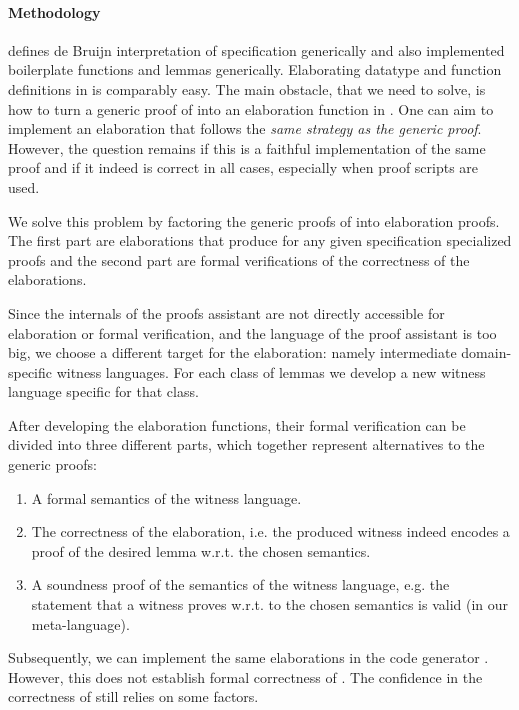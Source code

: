 \paragraph{Methodology}
\Loom defines de Bruijn interpretation of \Knot specification generically and
also implemented boilerplate functions and lemmas generically. Elaborating
datatype and function definitions in \Needle is comparably easy. The main
obstacle, that we need to solve, is how to turn a generic proof of \Loom into an
elaboration function in \Needle. One can aim to implement an elaboration that
follows the \emph{same strategy as the generic proof}. However, the question
remains if this is a faithful implementation of the same proof and if it indeed
is correct in all cases, especially when proof scripts are used.

We solve this problem by factoring the generic proofs of \Loom into elaboration
proofs. The first part are elaborations that produce for any given specification
specialized proofs and the second part are formal verifications of the
correctness of the elaborations.

Since the internals of the proofs assistant are not directly accessible for
elaboration or formal verification, and the language of the proof assistant is
too big, we choose a different target for the elaboration: namely intermediate
domain-specific witness languages. For each class of lemmas we develop a new
witness language specific for that class.

After developing the elaboration functions, their formal verification can be
divided into three different parts, which together represent alternatives to the
generic proofs:
\begin{enumerate}
\item A formal semantics of the witness language.
\item The correctness of the elaboration, i.e. the produced witness indeed
  encodes a proof of the desired lemma w.r.t. the chosen semantics.
\item A soundness proof of the semantics of the witness language, e.g. the
  statement that a witness proves w.r.t. to the chosen semantics is valid (in
  our meta-language).
\end{enumerate}

Subsequently, we can implement the same elaborations in the code generator
\Needle. However, this does not establish formal correctness of \Needle. The
confidence in the correctness of \Needle still relies on some factors.

